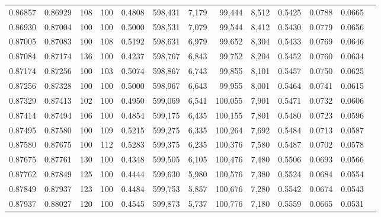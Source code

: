 \begin{tabular}{rrrrrrrrrrrrr}
0.86857 & 0.86929 &   108 & 100 &                                     0.4808 & 598,431 &   7,179 &  99,444 &   8,512 & 0.5425 & 0.0788 & 0.0665 \\
0.86930 & 0.87004 &   100 & 100 &                                     0.5000 & 598,531 &   7,079 &  99,544 &   8,412 & 0.5430 & 0.0779 & 0.0656 \\
0.87005 & 0.87083 &   100 & 108 &                                     0.5192 & 598,631 &   6,979 &  99,652 &   8,304 & 0.5433 & 0.0769 & 0.0646 \\
0.87084 & 0.87174 &   136 & 100 &                                     0.4237 & 598,767 &   6,843 &  99,752 &   8,204 & 0.5452 & 0.0760 & 0.0634 \\
0.87174 & 0.87256 &   100 & 103 &                                     0.5074 & 598,867 &   6,743 &  99,855 &   8,101 & 0.5457 & 0.0750 & 0.0625 \\
0.87256 & 0.87328 &   100 & 100 &                                     0.5000 & 598,967 &   6,643 &  99,955 &   8,001 & 0.5464 & 0.0741 & 0.0615 \\
0.87329 & 0.87413 &   102 & 100 &                                     0.4950 & 599,069 &   6,541 & 100,055 &   7,901 & 0.5471 & 0.0732 & 0.0606 \\
0.87414 & 0.87494 &   106 & 100 &                                     0.4854 & 599,175 &   6,435 & 100,155 &   7,801 & 0.5480 & 0.0723 & 0.0596 \\
0.87495 & 0.87580 &   100 & 109 &                                     0.5215 & 599,275 &   6,335 & 100,264 &   7,692 & 0.5484 & 0.0713 & 0.0587 \\
0.87580 & 0.87675 &   100 & 112 &                                     0.5283 & 599,375 &   6,235 & 100,376 &   7,580 & 0.5487 & 0.0702 & 0.0578 \\
0.87675 & 0.87761 &   130 & 100 &                                     0.4348 & 599,505 &   6,105 & 100,476 &   7,480 & 0.5506 & 0.0693 & 0.0566 \\
0.87762 & 0.87849 &   125 & 100 &                                     0.4444 & 599,630 &   5,980 & 100,576 &   7,380 & 0.5524 & 0.0684 & 0.0554 \\
0.87849 & 0.87937 &   123 & 100 &                                     0.4484 & 599,753 &   5,857 & 100,676 &   7,280 & 0.5542 & 0.0674 & 0.0543 \\
0.87937 & 0.88027 &   120 & 100 &                                     0.4545 & 599,873 &   5,737 & 100,776 &   7,180 & 0.5559 & 0.0665 & 0.0531 \\

\end{tabular}
